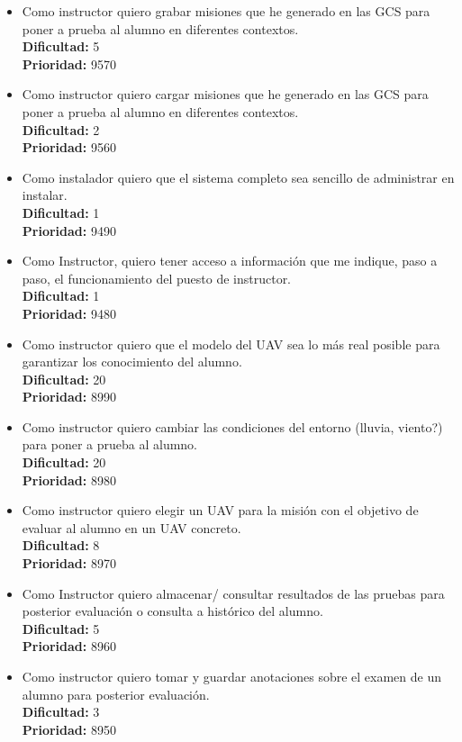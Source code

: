 \documentclass[12pt,a4paper,spanish]{book} %
\begin{document}
\begin{itemize}
\item Como instructor quiero grabar misiones que he generado en las GCS para poner a prueba al alumno en diferentes contextos.
\\
\textbf{Dificultad: }5
\\
\textbf{Prioridad: }9570
\item Como instructor quiero cargar misiones que he generado en las GCS para poner a prueba al alumno en diferentes contextos.
\\
\textbf{Dificultad: }2
\\
\textbf{Prioridad: }9560
\item Como instalador quiero que el sistema completo sea sencillo de administrar en instalar.
\\
\textbf{Dificultad: }1
\\
\textbf{Prioridad: }9490
\item Como Instructor, quiero tener acceso a información que me indique, paso a paso, el funcionamiento del puesto de instructor.
\\
\textbf{Dificultad: }1
\\
\textbf{Prioridad: }9480
\item Como instructor quiero que el modelo del UAV sea lo más real posible para garantizar los conocimiento del alumno.
\\
\textbf{Dificultad: }20
\\
\textbf{Prioridad: }8990
\item Como instructor quiero cambiar las condiciones del entorno (lluvia, viento?) para poner a prueba al alumno.
\\
\textbf{Dificultad: }20
\\
\textbf{Prioridad: }8980
\item Como instructor quiero elegir un UAV para la misión con el objetivo de evaluar al alumno en un UAV concreto.
\\
\textbf{Dificultad: }8
\\
\textbf{Prioridad: }8970
\item Como Instructor quiero almacenar/ consultar resultados de las pruebas para posterior evaluación o consulta a histórico del alumno.
\\
\textbf{Dificultad: }5
\\
\textbf{Prioridad: }8960
\item Como instructor quiero tomar y guardar anotaciones sobre el examen de un alumno para posterior evaluación.
\\
\textbf{Dificultad: }3
\\
\textbf{Prioridad: }8950

\end{itemize}
\end{document}
